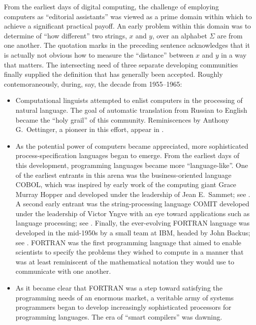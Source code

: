 From the earliest days of digital computing, the challenge of
employing computers as ``editorial assistants'' was viewed as a prime
domain within which to achieve a significant practical payoff.  An
early problem within this domain was to determine of ``how different''
two strings, $x$ and $y$, over an alphabet $\Sigma$ are from one
another.  The quotation marks in the preceding sentence acknowledges
that it is actually not obvious how to measure the ``distance''
between $x$ and $y$ in a way that matters.  The intersecting need of
three separate developing communities finally supplied the definition
that has generally been accepted.  Roughly contemoraneously, during,
say, the decade from 1955--1965:
  \begin{itemize}
  \item
Computational linguists attempted to enlist computers in the
processing of natural language.  The goal of automatic translation
from Russian to English became the ``holy grail'' of this community.
Reminiscences by Anthony G.~Oettinger, 
a pioneer in this effort, appear in \cite{Hutchins00}.
   \item
As the potential power of computers became appreciated, more
sophisticated process-specification languages began to emerge.  From
the earliest days of this development, programming languages became
more ``language-like''.  One of the earliest entrants in this arena
was the business-oriented language COBOL, which was inspired by early
work of the computing giant Grace Murray Hopper 
 and developed under the leadership of
Jean E.~Sammet;  see \cite{Sammet78}.  A second
early entrant was the string-processing language COMIT developed under
the leadership of Victor Yngve  with an eye
toward applications such as language processing; see \cite{Yngve}.
Finally, the ever-evolving FORTRAN language was developed in the
mid-1950s by a small team at IBM, headed by John Backus;
 see \cite{Backus-etal57}.  FORTRAN was the first
programming language that aimed to enable scientists to specify the
problems they wished to compute in a manner that was at least
reminiscent of the mathematical notation they would use to communicate
with one another.
   \item
As it became clear that FORTRAN was a step toward satisfying the
programming needs of an enormous market, a veritable army of systems
programmers began to develop increasingly sophisticated processors for
programming languages.  The era of ``smart compilers'' was dawning.
   \end{itemize}

